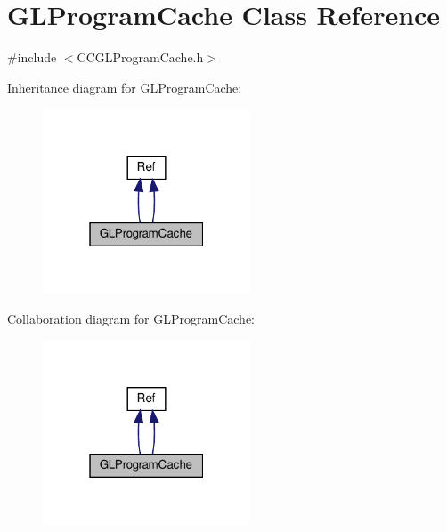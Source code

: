 \hypertarget{classGLProgramCache}{}\section{G\+L\+Program\+Cache Class Reference}
\label{classGLProgramCache}


{\ttfamily \#include $<$C\+C\+G\+L\+Program\+Cache.\+h$>$}



Inheritance diagram for G\+L\+Program\+Cache\+:
\nopagebreak
\begin{figure}[H]
\begin{center}
\leavevmode
\includegraphics[width=175pt]{classGLProgramCache__inherit__graph}
\end{center}
\end{figure}


Collaboration diagram for G\+L\+Program\+Cache\+:
\nopagebreak
\begin{figure}[H]
\begin{center}
\leavevmode
\includegraphics[width=175pt]{classGLProgramCache__coll__graph}
\end{center}
\end{figure}
